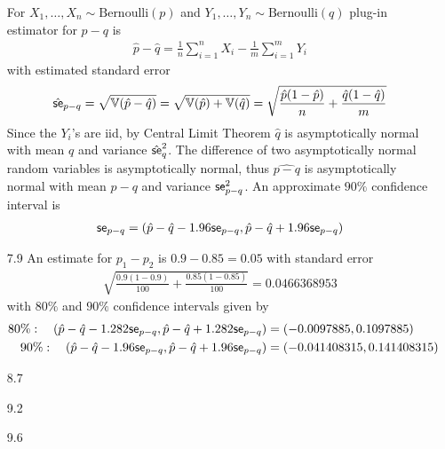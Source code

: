 \documentclass[a4paper,10pt]{article}
\theoremstyle{definition}
\begin{document}
\begin{enumerate}
For $X_1, \ldots, X_n \sim \text{Bernoulli}(p)$ and $Y_1, \ldots, Y_n \sim \text{Bernoulli}(q)$ plug-in estimator for $p-q$ is 
\begin{align*}
\hat{p}-\hat{q}=\frac{1}{n}\sum_{i=1}^{n}X_i - \frac{1}{m}\sum_{i=1}^{m}Y_i
\end{align*}
with estimated standard error 
\begin{align*}
\hat{\text{\sffamily se}}_{p-q} = \sqrt{\mathbb{V}(\hat{p}-\hat{q})} = \sqrt{\mathbb{V}(\hat{p})+\mathbb{V}(\hat{q})}= \sqrt{\frac{\hat{p}(1-\hat{p})}{n}+\frac{\hat{q}(1-\hat{q})}{m} }
\end{align*}
Since the $Y_i$'s are iid, by Central Limit Theorem $\hat{q}$ is asymptotically normal with mean $q$ and variance $\hat{\text{\sffamily se}}_q^2$. The difference of two asymptotically normal random variables is asymptotically normal, thus $\hat{p-q}$ is asymptotically normal with mean $p-q$ and variance $\text{\sffamily se}_{p-q}^2$. An approximate $90\%$ confidence interval is 
\begin{align*}
\text{\sffamily se}_{p-q}=(\hat{p}-\hat{q}-1.96\text{\sffamily se}_{p-q},\hat{p}-\hat{q}+1.96\text{\sffamily se}_{p-q})
\end{align*}
\item[7.9] An estimate for $p_1-p_2$ is $0.9-0.85=0.05$ with standard error 
\begin{align*}
\sqrt{\frac{0.9(1-0.9)}{100}+\frac{0.85(1-0.85)}{100}}= 0.0466368953
\end{align*}
with $80\%$ and $90\%$ confidence intervals given by
\begin{align*}
80\%:\quad(\hat{p}-\hat{q}-1.282\text{\sffamily se}_{p-q},\hat{p}-\hat{q}+1.282\text{\sffamily se}_{p-q})&=(-0.0097885,0.1097885)\\
90\%:\quad(\hat{p}-\hat{q}-1.96\text{\sffamily se}_{p-q},\hat{p}-\hat{q}+1.96\text{\sffamily se}_{p-q})&=(-0.041408315,0.141408315)
\end{align*} 

\item[8.7]

\item[9.2]

\item[9.6] 

\end{enumerate}
\end{document}
